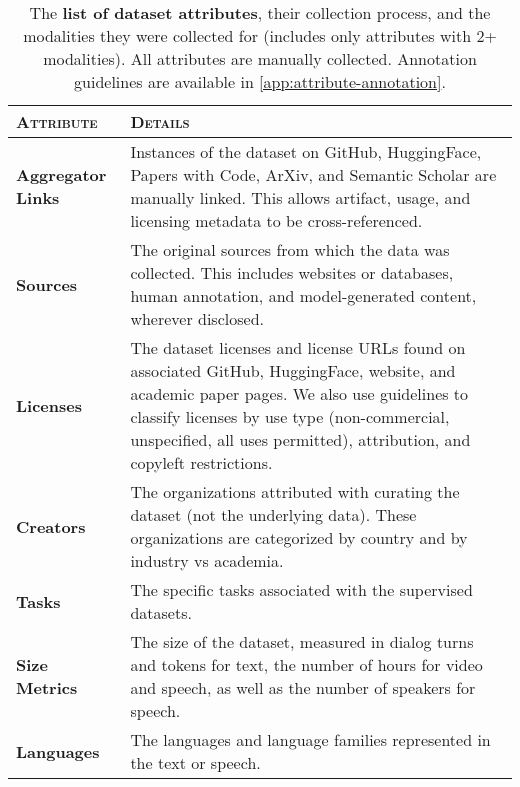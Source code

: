 \begin{table*}[t!]
\centering
\renewcommand{\arraystretch}{1.5}
\begin{adjustbox}{width=\textwidth}
\begin{tabular}{p{3cm} | p{16cm}}
\toprule
\textsc{Attribute} & \textsc{Details}  \\
\midrule

\textbf{Aggregator Links} & Instances of the dataset on GitHub, HuggingFace, Papers with Code, ArXiv, and Semantic Scholar are manually linked. This allows artifact, usage, and licensing metadata to be cross-referenced. \\ \rowcolor[gray]{0.9}
\textbf{Sources} & The original sources from which the data was collected. This includes websites or databases, human annotation, and model-generated content, wherever disclosed.  \\
\textbf{Licenses} & The dataset licenses and license URLs found on associated GitHub, HuggingFace, website, and academic paper pages. We also use \citet{longpre2023data} guidelines to classify licenses by use type (non-commercial, unspecified, all uses permitted), attribution, and copyleft restrictions.  \\ \rowcolor[gray]{0.9}
\textbf{Creators} & The organizations attributed with curating the dataset (not the underlying data). These organizations are categorized by country and by industry vs academia.  \\
\textbf{Tasks} & The specific tasks associated with the supervised datasets.  \\ \rowcolor[gray]{0.9}
\textbf{Size Metrics} & The size of the dataset, measured in dialog turns and tokens for text, the number of hours for video and speech, as well as the number of speakers for speech.  \\
\textbf{Languages} & The languages and language families represented in the text or speech. \\


\bottomrule
\end{tabular}
\end{adjustbox}
\caption{The \textbf{list of dataset attributes}, their collection process, and the modalities they were collected for (includes only attributes with 2+ modalities). All attributes are manually collected. Annotation guidelines are available in \cref{app:attribute-annotation}.}
\label{tab:attributes}
\vspace{-2mm}
\end{table*}

